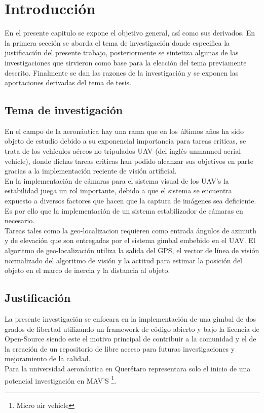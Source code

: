%

\chapter{Introducción}
\label{sec:intro}



En el presente capitulo se expone el objetivo general, así como sus derivados. En la
primera sección se aborda el tema de investigación donde especifica la justificación del
presente trabajo, posteriormente se sintetiza algunas de las investigaciones que sirvieron
como base para la elección del tema previamente descrito. Finalmente se dan las razones
de la investigación y se exponen las aportaciones derivadas del tema de tesis.

\section{Tema de investigación}
En el campo de la aeronáutica hay una rama que en los últimos años ha sido objeto
de estudio debido a su exponencial importancia para tareas criticas, se trata de los
vehículos aéreos no tripulados UAV (del inglés unmanned aerial vehicle), donde dichas
tareas criticas han podido alcanzar sus objetivos en parte gracias a la implementación
reciente de visión artificial.\\
En la implementación de cámaras para el sistema visual de los UAV's la estabilidad
juega un rol importante, debido a que el sistema se encuentra expuesto a diversos
factores que hacen que la captura de imágenes sea deficiente. Es por ello que la
implementación de un sistema estabilizador de cámaras en necesario.\\
Tareas tales como la geo-localizacion requieren como entrada ángulos de azimuth
y de elevación que son entregadas por el sistema gimbal embebido en el UAV.
El algoritmo de geo-localización utiliza la salida del GPS, el vector de línea de
visión normalizado del algoritmo de visión y la actitud para estimar la posición del
objeto en el marco de inercia y la distancia al objeto.

\section{Justificación}
La presente investigación se enfocara en la implementación de una gimbal de dos grados
de libertad utilizando un framework de código abierto y bajo la licencia de Open-Source
siendo este el motivo principal de contribuir a la comunidad y el de la creación de
un repositorio de libre acceso para futuras investigaciones y mejoramiento de la calidad.\\
Para la universidad aeronáutica en Querétaro representara solo el inicio de una potencial
investigación en MAV'S \footnote{Micro air vehicle}.

